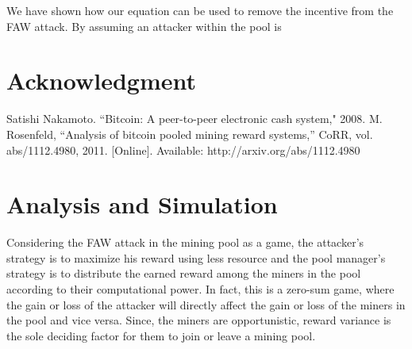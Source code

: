\documentclass[runningheads]{llncs}
\begin{document}
We have shown how our equation can be used to remove the incentive from the FAW attack. By assuming an attacker within the pool is


\section*{Acknowledgment}

%
%

\begin{thebibliography}{00}
 Satishi Nakamoto. ``Bitcoin: A peer-to-peer electronic cash system," 2008.
 M. Rosenfeld, ``Analysis of bitcoin pooled mining reward
systems,” CoRR, vol. abs/1112.4980, 2011. [Online]. Available:
http://arxiv.org/abs/1112.4980
\end{thebibliography}

\section{Analysis and Simulation}
Considering the FAW attack in the mining pool as a game, the attacker’s strategy is to maximize his reward using less resource and the pool manager’s strategy is to distribute the earned reward among the miners in the pool according to their computational power. In fact, this is a zero-sum game, where the gain or loss of the attacker will directly affect the gain or loss of the miners in the pool and vice versa. Since, the miners are opportunistic, reward variance is the sole deciding factor for them to join or leave a mining pool. \\
\end{document}
